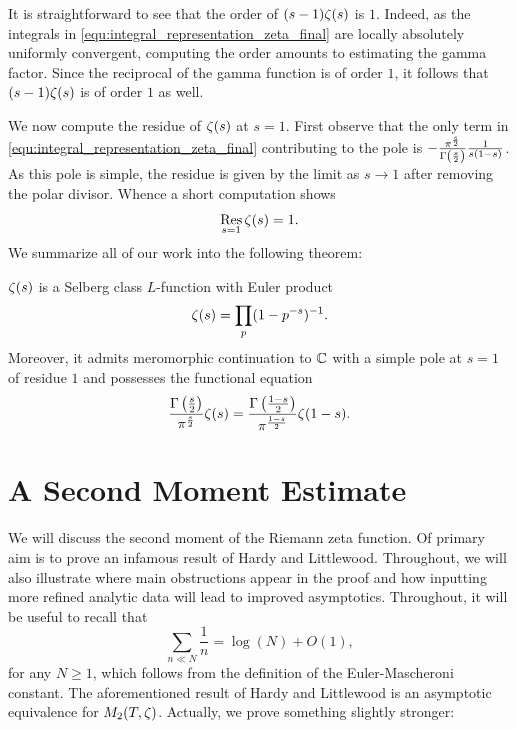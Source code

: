     It is straightforward to see that the order of \((s-1)\zeta(s)\) is \(1\). Indeed, as the integrals in \cref{equ:integral_representation_zeta_final} are locally absolutely uniformly convergent, computing the order amounts to estimating the gamma factor. Since the reciprocal of the gamma function is of order \(1\), it follows that \((s-1)\zeta(s)\) is of order \(1\) as well.

    We now compute the residue of \(\zeta(s)\) at \(s = 1\). First observe that the only term in \cref{equ:integral_representation_zeta_final} contributing to the pole is \(-\frac{\pi^{\frac{s}{2}}}{\Gamma\left(\frac{s}{2}\right)}\frac{1}{s(1-s)}\). As this pole is simple, the residue is given by the limit as \(s \to 1\) after removing the polar divisor. Whence a short computation shows
    \[
      \operatorname*{\mathrm{Res}}_{s = 1}\zeta(s) = 1.
    \]
    We summarize all of our work into the following theorem:

    \begin{theorem}\label{thm:zeta_Selberg}
      \(\zeta(s)\) is a Selberg class \(L\)-function with Euler product
      \[
        \zeta(s) = \prod_{p}(1-p^{-s})^{-1}.
      \]
      Moreover, it admits meromorphic continuation to \(\mathbb{C}\) with a simple pole at \(s = 1\) of residue \(1\) and possesses the functional equation
      \[
        \frac{\Gamma\left(\frac{s}{2}\right)}{\pi^{\frac{s}{2}}}\zeta(s) = \frac{\Gamma\left(\frac{1-s}{2}\right)}{\pi^{\frac{1-s}{2}}}\zeta(1-s).
      \]
    \end{theorem}
  \section{}
  \section{A Second Moment Estimate}
    We will discuss the second moment of the Riemann zeta function. Of primary aim is to prove an infamous result of Hardy and Littlewood. Throughout, we will also illustrate where main obstructions appear in the proof and how inputting more refined analytic data will lead to improved asymptotics. Throughout, it will be useful to recall that
    \begin{equation}\label{equ:approximation_for_harmonic_sums}
      \sum_{n \ll N}\frac{1}{n} = \log(N)+O(1),
    \end{equation}
    for any \(N \ge 1\), which follows from the definition of the Euler-Mascheroni constant. The aforementioned result of Hardy and Littlewood is an asymptotic equivalence for \(M_{2}(T,\zeta)\). Actually, we prove something slightly stronger:

